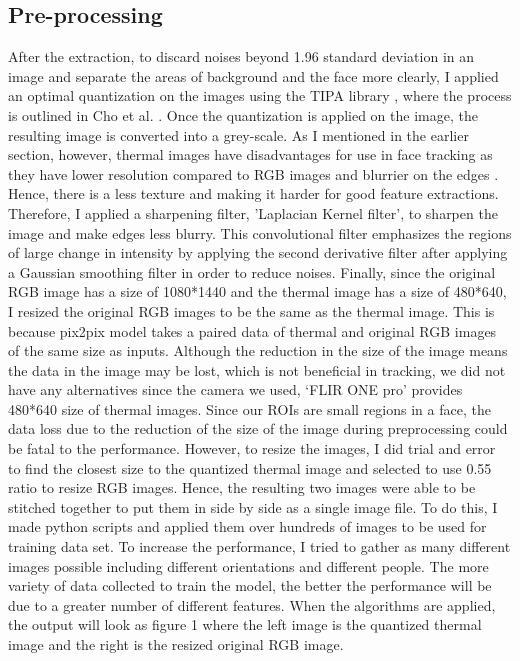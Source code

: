\documentclass[conference]{IEEEtran}
\begin{document}
\subsection{Pre-processing}
After the extraction, to discard noises beyond 1.96 standard deviation in an image and separate the areas of background and the face more clearly, I applied an optimal quantization on the images using the TIPA library \cite{b7}, where the process is outlined in Cho et al. \cite{b6}. Once the quantization is applied on the image, the resulting image is converted into a grey-scale. As I mentioned in the earlier section, however, thermal images have disadvantages for use in face tracking as they have lower resolution compared to RGB images and blurrier on the edges \cite{b2}. Hence, there is a less texture and making it harder for good feature extractions. Therefore, I applied a sharpening filter, ’Laplacian Kernel filter’, to sharpen the image and make edges less blurry. This convolutional filter emphasizes the regions of large change in intensity by applying the second derivative filter after applying a Gaussian smoothing filter in order to reduce noises. Finally, since the original RGB image has a size of 1080*1440 and the thermal image has a size of 480*640, I resized the original RGB images to be the same as the thermal image. This is because pix2pix model takes a paired data of thermal and original RGB images of the same size as inputs. Although the reduction in the size of the image means the data in the image may be lost, which is not beneficial in tracking, we did not have any alternatives since the camera we used, ‘FLIR ONE pro’ provides 480*640 size of thermal images. Since our ROIs are small regions in a face, the data loss due to the reduction of the size of the image during preprocessing could be fatal to the performance. However, to resize the images, I did trial and error to find the closest size to the quantized thermal image and selected to use 0.55 ratio to resize RGB images. Hence, the resulting two images were able to be stitched together to put them in side by side as a single image file. To do this, I made python scripts and applied them over hundreds of images to be used for training data set. To increase the performance, I tried to gather as many different images possible including different orientations and different people. The more variety of data collected to train the model, the better the performance will be due to a greater number of different features. When the algorithms are applied, the output will look as figure 1 where the left image is the quantized thermal image and the right is the resized original RGB image.\\
\end{document}
